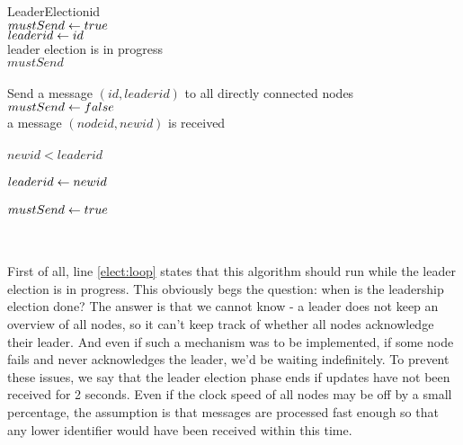 \begin{myalgo}{LeaderElection}{id}
  \\
 $mustSend \mathrel{\leftarrow} true$ \\
 $leaderid \mathrel{\leftarrow} id$ \\
 \label{elect:loop} \qwhile leader election is in progress \\
 \label{elect:checksend} \qdo \qif $mustSend$ \\
  \qthen {} \\
         Send a message $(id, leaderid)$ to all directly connected nodes \\
         \label{elect:endsend} $mustSend \mathrel{\leftarrow} false$ \qfi \\
  \label{elect:recv} \qif a message $(nodeid, newid)$ is received \\
  \qthen {} \\
         \qif $newid < leaderid$ \\
         \qthen {} \\
                $leaderid \mathrel{\leftarrow} newid$ \\
                 \\
                \label{elect:recvdone} $mustSend \mathrel{\leftarrow} true$ \\
         \qelse \label{elect:ign1}  \\
                \label{elect:ign2} \qignore \qfi \qfi \qelihw \\
  \label{elect:checkldr} 
\end{myalgo}

First of all, line \ref{elect:loop} states that this algorithm should run while the leader election is in progress. This obviously begs the question: when is the leadership election done? The answer is that we cannot know - a leader does not keep an overview of all nodes, so it can't keep track of whether all nodes acknowledge their leader. And even if such a mechanism was to be implemented, if some node fails and never acknowledges the leader, we'd be waiting indefinitely. To prevent these issues, we say that the leader election phase ends if updates have not been received for 2 seconds. Even if the clock speed of all nodes may be off by a small percentage, the assumption is that messages are processed fast enough so that any lower identifier would have been received within this time.

